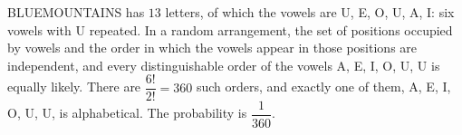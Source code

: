 BLUEMOUNTAINS has $13$ letters, of which the vowels are U, E, O, U, A, I: six vowels with U repeated. In a random arrangement, the set of positions occupied by vowels and the order in which the vowels appear in those positions are independent, and every distinguishable order of the vowels A, E, I, O, U, U is equally likely. There are $\dfrac{6!}{2!}=360$ such orders, and exactly one of them, A, E, I, O, U, U, is alphabetical. The probability is $\boxed{\dfrac{1}{360}}$.
